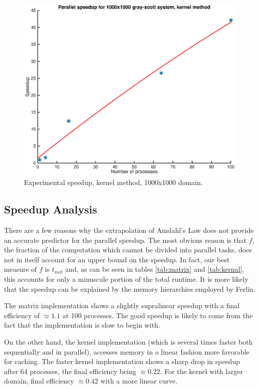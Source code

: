 \documentclass[a4paper,11pt]{article}
\begin{document}
\begin{figure}
  \centering
  \includegraphics[scale=0.6]{kernel-1k}
    \caption{Experimental speedup, kernel method, 1000x1000 domain.}
    \label{fig:kernel-1k}
\end{figure}

\subsection*{Speedup Analysis}
There are a few reasons why the extrapolation of Amdahl's Law does not provide an accurate predictor for the parallel speedup.  The most obvious reason is that $f$, the fraction of the computation which cannot be divided into parallel tasks, does not in itself account for an upper bound on the speedup.  In fact, our best measure of $f$ is $t_{init}$ and, as can be seen in tables \ref{tab:matrix} and \ref{tab:kernal}, this accounts for only a minuscule portion of the total runtime.  It is more likely that the speedup can be explained by the memory hierarchies employed by Ferlin.  

The matrix implementation shows a slightly supralinear speedup with a final efficiency of $\approx1.1$ at 100 processes. The good speedup is likely to come from the fact that the implementation is slow to begin with.

On the other hand, the kernel implementation (which is several times faster both sequentially and in parallel), accesses memory in a linear fashion more favorable for caching. The faster kernel implementation shows a sharp drop in speedup after 64 processes, the final efficiency being $\approx0.22$. For the kernel with larger domain, final efficiency $\approx0.42$ with a more linear curve.
\end{document}
